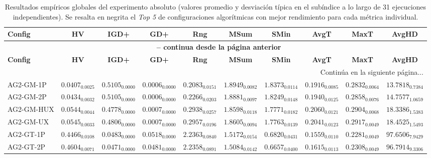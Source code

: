 \begingroup
\tiny
\setlength{\tabcolsep}{0.5pt}
\begin{longtable}{@{}lccccccccc@{}}
\caption[Resultados empíricos de las métricas de evaluación]{Resultados empíricos globales del experimento absoluto (valores promedio y desviación típica en el subíndice a lo largo de 31 ejecuciones independientes). Se resalta en negrita el \textit{Top 5} de configuraciones algorítmicas con mejor rendimiento para cada métrica individual.}
\label{tab:resultados_metricas} \\
\toprule
\textbf{Config} & \textbf{HV} & \textbf{IGD+} & \textbf{GD+} & \textbf{Rng} & \textbf{MSum} & \textbf{SMin} & \textbf{AvgT} & \textbf{MaxT} & \textbf{AvgHD} \\
\midrule
\endfirsthead
\multicolumn{10}{c}{{\bfseries \tablename\ \thetable{} -- continua desde la página anterior}} \\
\toprule
\textbf{Config} & \textbf{HV} & \textbf{IGD+} & \textbf{GD+} & \textbf{Rng} & \textbf{MSum} & \textbf{SMin} & \textbf{AvgT} & \textbf{MaxT} & \textbf{AvgHD} \\
\midrule
\endhead
\midrule \multicolumn{10}{r}{{Continúa en la siguiente página...}} \\
\endfoot
\bottomrule
\endlastfoot
AG2-GM-1P & $0.0407_{0.0025}$ & $0.5105_{0.0000}$ & $0.0006_{0.0000}$ & $0.2083_{0.0151}$ & $1.8949_{0.0082}$ & $1.8373_{0.0114}$ & $0.1916_{0.0085}$ & $0.2832_{0.0064}$ & $13.7818_{0.7384}$ \\
AG2-GM-2P & $0.0434_{0.0032}$ & $0.5105_{0.0000}$ & $0.0006_{0.0000}$ & $0.2266_{0.0203}$ & $1.8881_{0.0097}$ & $1.8249_{0.0148}$ & $0.1940_{0.0125}$ & $\mathbf{0.2858}_{0.0076}$ & $14.7577_{1.0659}$ \\
AG2-GM-HUX & $0.0544_{0.0044}$ & $0.4778_{0.0000}$ & $0.0007_{0.0000}$ & $0.2938_{0.0257}$ & $1.8598_{0.0118}$ & $1.7771_{0.0182}$ & $0.2060_{0.0121}$ & $\mathbf{0.2904}_{0.0068}$ & $18.3386_{1.5383}$ \\
AG2-GM-UX & $0.0545_{0.0033}$ & $0.4806_{0.0000}$ & $0.0007_{0.0000}$ & $0.2957_{0.0196}$ & $1.8605_{0.0094}$ & $1.7763_{0.0139}$ & $0.2041_{0.0123}$ & $\mathbf{0.2917}_{0.0049}$ & $18.4525_{1.5493}$ \\
AG2-GT-1P & $0.4466_{0.0108}$ & $0.0483_{0.0000}$ & $0.0518_{0.0000}$ & $\mathbf{2.2363}_{0.0840}$ & $1.5172_{0.0154}$ & $0.6820_{0.0431}$ & $0.1559_{0.0110}$ & $0.2281_{0.0049}$ & $97.6506_{7.9429}$ \\
AG2-GT-2P & $0.4604_{0.0071}$ & $0.0471_{0.0000}$ & $0.0481_{0.0000}$ & $2.2358_{0.0891}$ & $1.5084_{0.0142}$ & $0.6657_{0.0400}$ & $0.1615_{0.0113}$ & $0.2308_{0.0049}$ & $96.7914_{9.3306}$ \\

\end{longtable}
